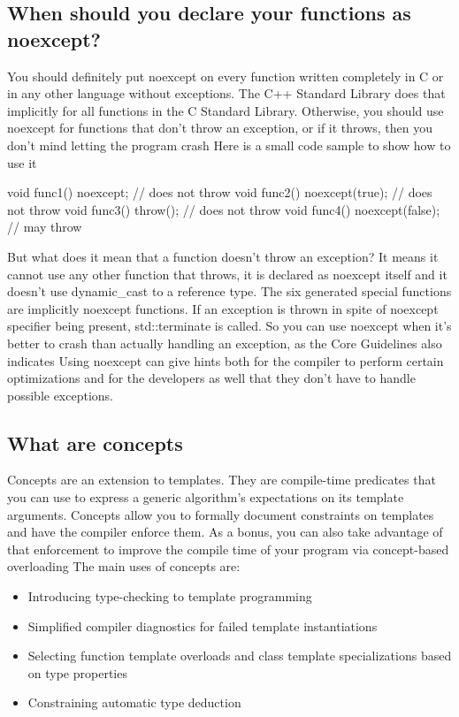 \documentclass{report}
\begin{document}
\bigbreak \noindent 
\subsection{When should you declare your functions as noexcept?}
\bigbreak \noindent 
You should definitely put noexcept on every function written
completely in C or in any other language without exceptions. The
C++ Standard Library does that implicitly for all functions in the C
Standard Library.
\bigbreak \noindent 
Otherwise, you should use noexcept for functions that don’t throw
an exception, or if it throws, then you don’t mind letting the
program crash
\bigbreak \noindent 
Here is a small code sample to show how to use it
\bigbreak \noindent 
\begin{cppcode}
void func1() noexcept; // does not throw
void func2() noexcept(true); // does not throw
void func3() throw(); // does not throw
void func4() noexcept(false); // may throw
\end{cppcode}
\bigbreak \noindent 
But what does it mean that a function doesn’t throw an exception?
It means it cannot use any other function that throws, it is declared
as noexcept itself and it doesn’t use dynamic\_cast to a reference
type.
\bigbreak \noindent 
The six generated special functions are implicitly noexcept functions.
\bigbreak \noindent 
If an exception is thrown in spite of noexcept specifier being
present, std::terminate is called.
\bigbreak \noindent 
So you can use noexcept when it’s better to crash than actually
handling an exception, as the Core Guidelines also indicates
\bigbreak \noindent 
Using noexcept can give hints both for the compiler to perform
certain optimizations and for the developers as well that they don’t
have to handle possible exceptions.


\pagebreak 
{}
\bigbreak \noindent 
\subsection{What are concepts}
\bigbreak \noindent 
Concepts are an extension to templates. They are compile-time
predicates that you can use to express a generic algorithm’s expectations on its template arguments.
\bigbreak \noindent 
Concepts allow you to formally document constraints on templates
and have the compiler enforce them. As a bonus, you can also take
advantage of that enforcement to improve the compile time of your
program via concept-based overloading
\bigbreak \noindent 
The main uses of concepts are:
\begin{itemize}
    \item Introducing type-checking to template programming
    \item Simplified compiler diagnostics for failed template instantiations
    \item Selecting function template overloads and class template specializations based on type properties
    \item Constraining automatic type deduction
\end{itemize}
\end{document}
